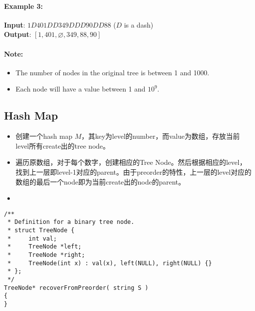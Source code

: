\paragraph{Example 3:}
\begin{flushleft}
\begin{figure}[H]
\end{figure}
\textbf{Input}: $1D401DD349DDD90DD88$ ($ D $ is a dash)
\\
\textbf{Output}: $[1,401,\varnothing,349,88,90]$
\end{flushleft}

\paragraph{Note:}

\begin{itemize}
\item The number of nodes in the original tree is between 1 and 1000. 
\item Each node will have a value between 1 and $ 10^9 $.
\end{itemize}

\subsection{Hash Map}
\begin{itemize}
\item 创建一个hash map $M$，其key为level的number，而value为数组，存放当前level所有create出的tree node。
\item 遍历原数组，对于每个数字，创建相应的Tree Node。然后根据相应的level，找到上一层即level-1对应的parent。由于preorder的特性，上一层的level对应的数组的最后一个node即为当前create出的node的parent。
\item 
\end{itemize}

\setcounter{lstlisting}{0}
\begin{lstlisting}[style=customc, caption={TODO}]
/**
 * Definition for a binary tree node.
 * struct TreeNode {
 *     int val;
 *     TreeNode *left;
 *     TreeNode *right;
 *     TreeNode(int x) : val(x), left(NULL), right(NULL) {}
 * };
 */
TreeNode* recoverFromPreorder( string S )
{
}
\end{lstlisting}